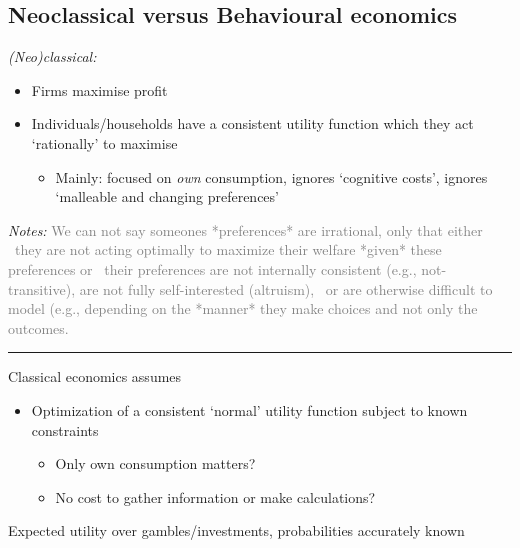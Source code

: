 \documentclass[]{article}
\providecommand{\tightlist}{%
  \setlength{\itemsep}{0pt}\setlength{\parskip}{0pt}}
\begin{document}
\hypertarget{neoclassical-versus-behavioural-economics}{%
\subsection{Neoclassical versus Behavioural economics}\label{neoclassical-versus-behavioural-economics}}

\emph{(Neo)classical:}

\begin{itemize}
\tightlist
\item
  Firms maximise profit
\item
  Individuals/households have a consistent utility function which they act `rationally' to maximise

  \begin{itemize}
  \tightlist
  \item
    Mainly: focused on \emph{own} consumption, ignores `cognitive costs', ignores `malleable and changing preferences'
  \end{itemize}
\end{itemize}

\emph{Notes:}
\textcolor{gray}{We can not say someones *preferences* are irrational, only that either \
they are not acting optimally to maximize their welfare *given* these preferences or \
their preferences are not internally consistent (e.g., not-transitive), are not fully self-interested (altruism), \
 or are otherwise difficult to model (e.g., depending on the *manner* they make choices and not only the outcomes.}

\begin{center}\rule{0.5\linewidth}{\linethickness}\end{center}

Classical economics assumes

\begin{itemize}
\tightlist
\item
  Optimization of a consistent `normal' utility function subject to known constraints

  \begin{itemize}
  \tightlist
  \item
    Only own consumption matters?
  \item
    No cost to gather information or make calculations?
  \end{itemize}
\end{itemize}

\bigskip

Expected utility over gambles/investments, probabilities accurately known
\end{document}
